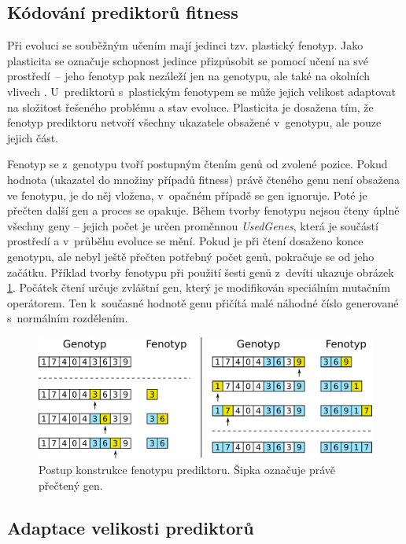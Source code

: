 \documentclass[czech]{ExcelAtFIT} %
\begin{document}
\subsection{Kódování prediktorů fitness}

Při evoluci se souběžným učením mají jedinci tzv. plas\-tický fenotyp. Jako plasticita se označuje schopnost jedince přizpůsobit se pomocí učení na své prostředí~-- jeho fenotyp pak nezáleží jen na genotypu, ale také na okolních vlivech \cite{EllefsenBalancing}. U~prediktorů s~plastickým fenotypem se může jejich velikost adaptovat na složitost řešeného problému a stav evoluce. Plasticita je dosažena tím, že fenotyp prediktoru netvoří všechny ukazatele obsažené v~genotypu, ale pouze jejich část.

Fenotyp se z~genotypu tvoří postupným čtením genů od zvolené pozice. Pokud hodnota (ukazatel do množiny případů fitness) právě čteného genu není obsažena ve fenotypu, je do něj vložena, v~opačném případě se gen ignoruje. Poté je přečten další gen a proces se opakuje. Během tvorby fenotypu nejsou čteny úplně všechny geny -- jejich počet je určen proměnnou \emph{UsedGenes}, která je součástí prostředí a v~průběhu evoluce se mění. Pokud je při čtení dosaženo konce genotypu, ale nebyl ještě přečten potřebný počet genů, pokračuje se od jeho začátku. Příklad tvorby fenotypu při použití šesti genů z~devíti ukazuje obrázek \ref{fig:PhenotypeContruction}. Počátek čtení určuje zvláštní gen, který je modifikován speciálním mutačním operátorem. Ten k~současné hod\-notě genu přičítá malé náhodné číslo generované s~normálním rozdělením.

\begin{figure}[b]
    \centering\includegraphics[width=\linewidth]{images/phenotype2.pdf}
    \caption{Postup konstrukce fenotypu prediktoru. Šipka označuje právě přečtený gen.}
    \label{fig:PhenotypeContruction}
\end{figure}

\subsection{Adaptace velikosti prediktorů}
\end{document}
